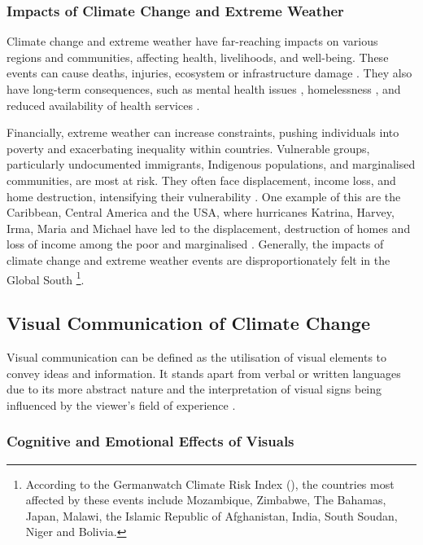 \subsubsection{Impacts of Climate Change and Extreme Weather}
\label{subsubsec:impacts-climate-change}

Climate change and extreme weather have far-reaching impacts on various regions and communities, affecting health, livelihoods, and well-being. These events can cause deaths, injuries, ecosystem or infrastructure damage \parencite[79]{ipcc_2023_technical}. They also have long-term consequences, such as mental health issues \parencite[1126]{ipcc2023_wg2_7}, homelessness \parencite[1251]{ipcc2023_wg2_8}, and reduced availability of health services \parencite[1632]{ipcc2023_wg2_11}.

Financially, extreme weather can increase constraints, pushing individuals into poverty and exacerbating inequality within countries. Vulnerable groups, particularly undocumented immigrants, Indigenous populations, and marginalised communities, are most at risk. They often face displacement, income loss, and home destruction, intensifying their vulnerability \parencite[1206]{ipcc2023_wg2_8}. One example of this are the Caribbean, Central America and the USA, where hurricanes Katrina, Harvey, Irma, Maria and Michael have led to the displacement, destruction of homes and loss of income among the poor and marginalised \parencite{Klinenberg2020}. Generally, the impacts of climate change and extreme weather events are disproportionately felt in the Global South \parencite[1180]{ipcc2023_wg2_8} \footnote{According to the Germanwatch Climate Risk Index (\citeyear{Germanwatch2021}),  the countries most affected by these events include Mozambique, Zimbabwe, The Bahamas, Japan, Malawi, the Islamic Republic of Afghanistan, India, South Soudan, Niger and Bolivia.}.

\subsection{Visual Communication of Climate Change}

Visual communication can be defined as the utilisation of visual elements to convey ideas and information. It stands apart from verbal or written languages due to its more abstract nature and the interpretation of visual signs being influenced by the viewer's field of experience \parencite{Smith2004}.

\subsubsection{Cognitive and Emotional Effects of Visuals}

